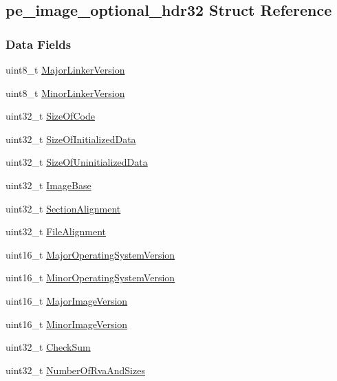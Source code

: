 \hypertarget{structpe__image__optional__hdr32}{\subsection{pe\-\_\-image\-\_\-optional\-\_\-hdr32 Struct Reference}
\label{structpe__image__optional__hdr32}
}
\subsubsection*{Data Fields}
\begin{DoxyCompactItemize}
\item 
uint8\-\_\-t \hyperlink{structpe__image__optional__hdr32_a9fe20c528b23d8a85a250c33c761b840}{Major\-Linker\-Version}
\item 
uint8\-\_\-t \hyperlink{structpe__image__optional__hdr32_a0cc5019694053488b343a458fbc0b657}{Minor\-Linker\-Version}
\item 
uint32\-\_\-t \hyperlink{structpe__image__optional__hdr32_abee9ed2d772fb9bec9f70e22d8f85c23}{Size\-Of\-Code}
\item 
uint32\-\_\-t \hyperlink{structpe__image__optional__hdr32_a042c05a92b0c90acf2e1ee4672857153}{Size\-Of\-Initialized\-Data}
\item 
uint32\-\_\-t \hyperlink{structpe__image__optional__hdr32_aa82afa1757a8a7b76df97b35b4afea84}{Size\-Of\-Uninitialized\-Data}
\item 
uint32\-\_\-t \hyperlink{structpe__image__optional__hdr32_a29eb1ba379985eaa71d0c25142f90b50}{Image\-Base}
\item 
uint32\-\_\-t \hyperlink{structpe__image__optional__hdr32_ae19363fc9558f4fe8d710789d031f9ac}{Section\-Alignment}
\item 
uint32\-\_\-t \hyperlink{structpe__image__optional__hdr32_a52c4f3c684bea4212e4fb8289794eb0d}{File\-Alignment}
\item 
uint16\-\_\-t \hyperlink{structpe__image__optional__hdr32_a47b3939102eef106f0fc4d6a96c3ad14}{Major\-Operating\-System\-Version}
\item 
uint16\-\_\-t \hyperlink{structpe__image__optional__hdr32_a8eb1d37329b3c54e63e8eb7832e30ba7}{Minor\-Operating\-System\-Version}
\item 
uint16\-\_\-t \hyperlink{structpe__image__optional__hdr32_a2902b4670e5eab8fcc2dc47c7fca868b}{Major\-Image\-Version}
\item 
uint16\-\_\-t \hyperlink{structpe__image__optional__hdr32_a7b61bcb8b63930c239079916325ae734}{Minor\-Image\-Version}
\item 
uint32\-\_\-t \hyperlink{structpe__image__optional__hdr32_ab09f6da5ce2f33ac63606127b1bb2760}{Check\-Sum}
\item 
uint32\-\_\-t \hyperlink{structpe__image__optional__hdr32_a51e6fb2cbc64a53b2bb577f2dd2f677f}{Number\-Of\-Rva\-And\-Sizes}
\end{DoxyCompactItemize}


